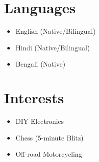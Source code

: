 \documentclass[letterpaper,11pt]{article}
\newcommand{\resumeItemPlain}[1]{
  \item\small{#1 \vspace{-2.5pt}}
}
\newcommand{\resumeSimpleListStart}{\begin{itemize}[leftmargin=0.15in, label=$\circ$, itemsep=1pt, parsep=0pt, topsep=1pt]}
\newcommand{\resumeSimpleListEnd}{\end{itemize}}
\begin{document}
\section{Languages}
  \resumeSimpleListStart
    \resumeItemPlain{English (Native/Bilingual)}
    \resumeItemPlain{Hindi (Native/Bilingual)}
    \resumeItemPlain{Bengali (Native)}
  \resumeSimpleListEnd


\section{Interests}
  \resumeSimpleListStart
    \resumeItemPlain{DIY Electronics}
    \resumeItemPlain{Chess (5-minute Blitz)}
    \resumeItemPlain{Off-road Motorcycling}
  \resumeSimpleListEnd


\end{document}
